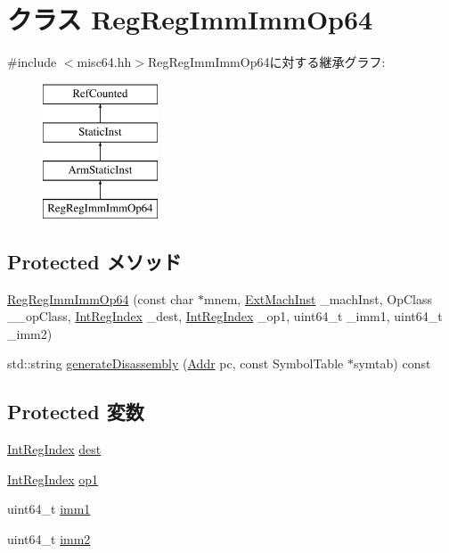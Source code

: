\hypertarget{classRegRegImmImmOp64}{
\section{クラス RegRegImmImmOp64}
\label{classRegRegImmImmOp64}
}


{\ttfamily \#include $<$misc64.hh$>$}RegRegImmImmOp64に対する継承グラフ:\begin{figure}[H]
\begin{center}
\leavevmode
\includegraphics[height=4cm]{classRegRegImmImmOp64}
\end{center}
\end{figure}
\subsection*{Protected メソッド}
\begin{DoxyCompactItemize}
\item 
\hyperlink{classRegRegImmImmOp64_a9fdd621bd5e4d003db45d00da6166dd7}{RegRegImmImmOp64} (const char $\ast$mnem, \hyperlink{classStaticInst_a5605d4fc727eae9e595325c90c0ec108}{ExtMachInst} \_\-machInst, OpClass \_\-\_\-opClass, \hyperlink{namespaceArmISA_ae64680ba9fb526106829d6bf92fc791b}{IntRegIndex} \_\-dest, \hyperlink{namespaceArmISA_ae64680ba9fb526106829d6bf92fc791b}{IntRegIndex} \_\-op1, uint64\_\-t \_\-imm1, uint64\_\-t \_\-imm2)
\item 
std::string \hyperlink{classRegRegImmImmOp64_a95d323a22a5f07e14d6b4c9385a91896}{generateDisassembly} (\hyperlink{classm5_1_1params_1_1Addr}{Addr} pc, const SymbolTable $\ast$symtab) const 
\end{DoxyCompactItemize}
\subsection*{Protected 変数}
\begin{DoxyCompactItemize}
\item 
\hyperlink{namespaceArmISA_ae64680ba9fb526106829d6bf92fc791b}{IntRegIndex} \hyperlink{classRegRegImmImmOp64_aec72e8e45bdc87abeeeb75d2a8a9a716}{dest}
\item 
\hyperlink{namespaceArmISA_ae64680ba9fb526106829d6bf92fc791b}{IntRegIndex} \hyperlink{classRegRegImmImmOp64_a4c465c43ad568f8bcf8ae71480e9cfea}{op1}
\item 
uint64\_\-t \hyperlink{classRegRegImmImmOp64_a846a1153344f66cc5d7c5af6fc071bb4}{imm1}
\item 
uint64\_\-t \hyperlink{classRegRegImmImmOp64_a4b3bca3d7461f9d143e9bcd456390a27}{imm2}
\end{DoxyCompactItemize}


